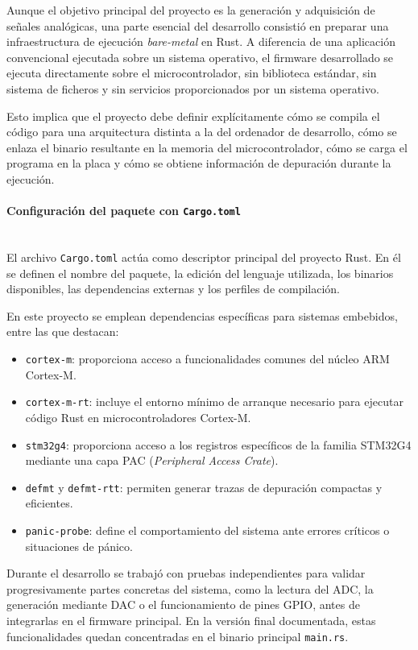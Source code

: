 \documentclass[11pt,a4paper]{article}
\newcommand{\myparagraph}[1]{\paragraph{#1}\mbox{}\\}
\begin{document}
Aunque el objetivo principal del proyecto es la generación y adquisición de señales analógicas, una parte esencial del desarrollo consistió en preparar una infraestructura de ejecución \textit{bare-metal} en Rust. A diferencia de una aplicación convencional ejecutada sobre un sistema operativo, el firmware desarrollado se ejecuta directamente sobre el microcontrolador, sin biblioteca estándar, sin sistema de ficheros y sin servicios proporcionados por un sistema operativo.

Esto implica que el proyecto debe definir explícitamente cómo se compila el código para una arquitectura distinta a la del ordenador de desarrollo, cómo se enlaza el binario resultante en la memoria del microcontrolador, cómo se carga el programa en la placa y cómo se obtiene información de depuración durante la ejecución.

\myparagraph{Configuración del paquete con \texttt{Cargo.toml}}

El archivo \texttt{Cargo.toml} actúa como descriptor principal del proyecto Rust. En él se definen el nombre del paquete, la edición del lenguaje utilizada, los binarios disponibles, las dependencias externas y los perfiles de compilación.

En este proyecto se emplean dependencias específicas para sistemas embebidos, entre las que destacan:

\begin{itemize}
    \item \texttt{cortex-m}: proporciona acceso a funcionalidades comunes del núcleo ARM Cortex-M.
    \item \texttt{cortex-m-rt}: incluye el entorno mínimo de arranque necesario para ejecutar código Rust en microcontroladores Cortex-M.
    \item \texttt{stm32g4}: proporciona acceso a los registros específicos de la familia STM32G4 mediante una capa PAC (\textit{Peripheral Access Crate}).
    \item \texttt{defmt} y \texttt{defmt-rtt}: permiten generar trazas de depuración compactas y eficientes.
    \item \texttt{panic-probe}: define el comportamiento del sistema ante errores críticos o situaciones de pánico.
\end{itemize}

Durante el desarrollo se trabajó con pruebas independientes para validar progresivamente partes concretas del sistema, como la lectura del ADC, la generación mediante DAC o el funcionamiento de pines GPIO, antes de integrarlas en el firmware principal. En la versión final documentada, estas funcionalidades quedan concentradas en el binario principal \texttt{main.rs}.
\end{document}

